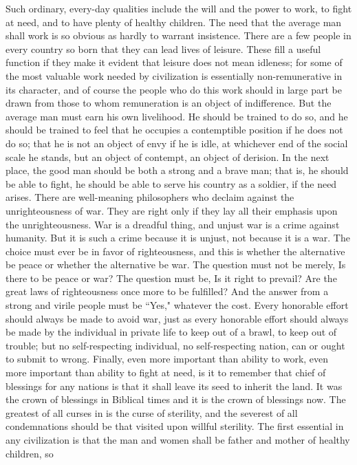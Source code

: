 \documentclass{scrbook}
\begin{document}
Such ordinary, every-day qualities include the will and the power to work, to fight at
need, and to have plenty of healthy children. The need that the average man shall work is
so obvious as hardly to warrant insistence. There are a few people in every country so born
that they can lead lives of leisure. These fill a useful function if they make it evident that
leisure does not mean idleness; for some of the most valuable work needed by civilization
is essentially non-remunerative in its character, and of course the people who do this work
should in large part be drawn from those to whom remuneration is an object of indifference.
But the average man must earn his own livelihood. He should be trained to do so, and he
should be trained to feel that he occupies a contemptible position if he does not do so; that
he is not an object of envy if he is idle, at whichever end of the social scale he stands, but
an object of contempt, an object of derision. In the next place, the good man should be both
a strong and a brave man; that is, he should be able to fight, he should be able to serve his
country as a soldier, if the need arises. There are well-meaning philosophers who declaim
against the unrighteousness of war. They are right only if they lay all their emphasis upon
the unrighteousness. War is a dreadful thing, and unjust war is a crime against humanity.
But it is such a crime because it is unjust, not because it is a war. The choice must ever be in
favor of righteousness, and this is whether the alternative be peace or whether the alternative
be war. The question must not be merely, Is there to be peace or war? The question must be,
Is it right to prevail? Are the great laws of righteousness once more to be fulfilled? And the
answer from a strong and virile people must be ``Yes," whatever the cost. Every honorable
effort should always be made to avoid war, just as every honorable effort should always be
made by the individual in private life to keep out of a brawl, to keep out of trouble; but no
self-respecting individual, no self-respecting nation, can or ought to submit to wrong.
Finally, even more important than ability to work, even more important than ability to
fight at need, is it to remember that chief of blessings for any nations is that it shall leave its
seed to inherit the land. It was the crown of blessings in Biblical times and it is the crown
of blessings now. The greatest of all curses in is the curse of sterility, and the severest of
all condemnations should be that visited upon willful sterility. The first essential in any
civilization is that the man and women shall be father and mother of healthy children, so
\end{document}

